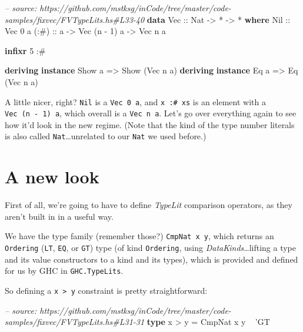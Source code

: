 \documentclass[]{article}
\newenvironment{Shaded}{\begin{snugshade}}{\end{snugshade}}
\newcommand{\CharTok}[1]{\textcolor[rgb]{0.31,0.60,0.02}{#1}}
\newcommand{\CommentTok}[1]{\textcolor[rgb]{0.56,0.35,0.01}{\textit{#1}}}
\newcommand{\DataTypeTok}[1]{\textcolor[rgb]{0.13,0.29,0.53}{#1}}
\newcommand{\DecValTok}[1]{\textcolor[rgb]{0.00,0.00,0.81}{#1}}
\newcommand{\FunctionTok}[1]{\textcolor[rgb]{0.00,0.00,0.00}{#1}}
\newcommand{\KeywordTok}[1]{\textcolor[rgb]{0.13,0.29,0.53}{\textbf{#1}}}
\newcommand{\NormalTok}[1]{#1}
\newcommand{\OtherTok}[1]{\textcolor[rgb]{0.56,0.35,0.01}{#1}}
\begin{document}
\begin{Shaded}
\begin{Highlighting}[]
\CommentTok{-- source: https://github.com/mstksg/inCode/tree/master/code-samples/fixvec/FVTypeLits.hs#L33-40}
\KeywordTok{data} \DataTypeTok{Vec}\OtherTok{ ::} \DataTypeTok{Nat} \OtherTok{->} \FunctionTok{*} \OtherTok{->} \FunctionTok{*} \KeywordTok{where}
    \DataTypeTok{Nil}\OtherTok{  ::} \DataTypeTok{Vec} \DecValTok{0}\NormalTok{ a}
\OtherTok{    (:#) ::}\NormalTok{ a }\OtherTok{->} \DataTypeTok{Vec}\NormalTok{ (n }\FunctionTok{-} \DecValTok{1}\NormalTok{) a }\OtherTok{->} \DataTypeTok{Vec}\NormalTok{ n a}

\KeywordTok{infixr} \DecValTok{5} \FunctionTok{:#}

\KeywordTok{deriving} \KeywordTok{instance} \DataTypeTok{Show}\NormalTok{ a }\OtherTok{=>} \DataTypeTok{Show}\NormalTok{ (}\DataTypeTok{Vec}\NormalTok{ n a)}
\KeywordTok{deriving} \KeywordTok{instance} \DataTypeTok{Eq}\NormalTok{ a }\OtherTok{=>} \DataTypeTok{Eq}\NormalTok{ (}\DataTypeTok{Vec}\NormalTok{ n a)}
\end{Highlighting}
\end{Shaded}

A little nicer, right? \texttt{Nil} is a \texttt{Vec\ 0\ a}, and
\texttt{x\ :\#\ xs} is an element with a \texttt{Vec\ (n\ -\ 1)\ a}, which
overall is a \texttt{Vec\ n\ a}. Let's go over everything again to see how it'd
look in the new regime. (Note that the kind of the type number literals is also
called \texttt{Nat}\ldots{}unrelated to our \texttt{Nat} we used before.)

\hypertarget{a-new-look}{%
\section{A new look}\label{a-new-look}}

First of all, we're going to have to define \emph{TypeLit} comparison operators,
as they aren't built in in a useful way.

We have the type family (remember those?) \texttt{CmpNat\ x\ y}, which returns
an \texttt{Ordering} (\texttt{LT}, \texttt{EQ}, or \texttt{GT}) type (of kind
\texttt{Ordering}, using \emph{DataKinds}\ldots{}lifting a type and its value
constructors to a kind and its types), which is provided and defined for us by
GHC in \texttt{GHC.TypeLits}.

So defining a \texttt{x\ \textgreater{}\ y} constraint is pretty
straightforward:

\begin{Shaded}
\begin{Highlighting}[]
\CommentTok{-- source: https://github.com/mstksg/inCode/tree/master/code-samples/fixvec/FVTypeLits.hs#L31-31}
\KeywordTok{type}\NormalTok{ x }\FunctionTok{>}\NormalTok{ y }\FunctionTok{=} \DataTypeTok{CmpNat}\NormalTok{ x y }\FunctionTok{~} \CharTok{'GT}
\end{Highlighting}
\end{Shaded}
\end{document}
